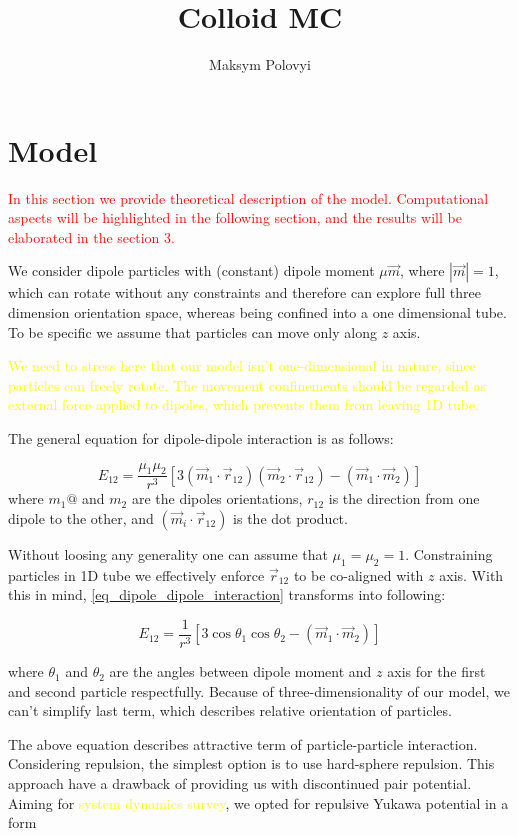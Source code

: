 \documentclass[12pt,a4paper]{article}
\author{Maksym Polovyi}
\title{Colloid MC}
\begin{document}
\section{Model}

\textcolor{red}{In this section we provide theoretical description of the model. Computational aspects will be highlighted in the following section, and the results will be elaborated in the section 3.}

We consider dipole particles with (constant) dipole moment $\mu \vec{m}$, where $|\vec{m}| = 1$, which can rotate without any constraints and therefore can explore full three dimension orientation space, whereas being confined into a one dimensional tube. To be specific we assume that particles can move only along $z$ axis.

\textcolor{yellow}{We need to stress here that our model isn't one-dimensional in nature, since particles can freely rotate. The movement confinements should be regarded as external force applied to dipoles, which prevents them from leaving 1D tube.}

The general equation for dipole-dipole interaction is as follows:

\label{eq_dipole_dipole_interaction}
\begin{equation}
E_{12} = \frac{\mu_1 \mu_2}{r^3}[3 (\vec{m}_1 \cdot \vec{r}_{12})(\vec{m}_2 \cdot \vec{r}_{12}) - (\vec{m}_1 \cdot \vec{m}_2)]
\end{equation}
where $m_1@$ and $m_2$ are the dipoles orientations, $r_{12}$ is the direction from one dipole to the other, and $(\vec{m}_i \cdot \vec{r}_{12})$ is the dot product.

Without loosing any generality one can assume that $\mu_1 = \mu_2 = 1$. Constraining particles in 1D tube we effectively enforce $\vec{r}_{12}$ to be co-aligned with $z$ axis. With this in mind, \ref{eq_dipole_dipole_interaction} transforms into following:

\label{eq_dipole_dipole_1D}
\begin{equation}
E_{12} = \frac{1}{r^3} [3 \cos \theta_1 \cos \theta_2 - (\vec{m}_1 \cdot \vec{m}_2)]
\end{equation}

where $\theta_1$ and $\theta_2$ are the angles between dipole moment and $z$ axis for the first and second particle respectfully. Because of three-dimensionality of our model, we can't simplify last term, which describes relative orientation of particles.

The above equation describes attractive term of particle-particle interaction. Considering repulsion, the simplest option is to use hard-sphere repulsion. This approach have a drawback of providing us with discontinued pair potential. Aiming for \textcolor{yellow}{system dynamics survey}, we opted for repulsive Yukawa potential in a form
\end{document}
